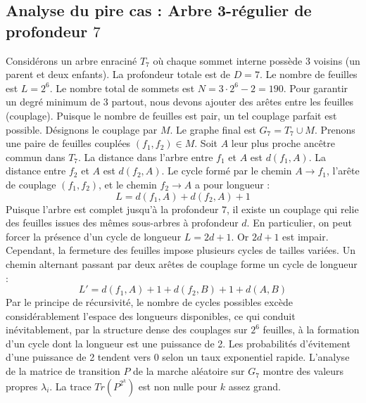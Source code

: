 \documentclass[11pt,a4paper]{article}
\begin{document}
\subsection{Analyse du pire cas : Arbre 3-régulier de profondeur $7$}
Considérons un arbre enraciné $T_{7}$ où chaque sommet interne possède 3 voisins (un parent et deux enfants).
La profondeur totale est de $D = 7$.
Le nombre de feuilles est $L = 2^{6}$.
Le nombre total de sommets est $N = 3 \cdot 2^{6} - 2 = 190$.
Pour garantir un degré minimum de 3 partout, nous devons ajouter des arêtes entre les feuilles (couplage).
Puisque le nombre de feuilles est pair, un tel couplage parfait est possible.
Désignons le couplage par $M$. Le graphe final est $G_{7} = T_{7} \cup M$.
Prenons une paire de feuilles couplées $(f_1, f_2) \in M$.
Soit $A$ leur plus proche ancêtre commun dans $T_{7}$.
La distance dans l'arbre entre $f_1$ et $A$ est $d(f_1, A)$.
La distance entre $f_2$ et $A$ est $d(f_2, A)$.
Le cycle formé par le chemin $A \to f_1$, l'arête de couplage $(f_1, f_2)$, et le chemin $f_2 \to A$ a pour longueur :
$$ L = d(f_1, A) + d(f_2, A) + 1 $$
Puisque l'arbre est complet jusqu'à la profondeur $7$, il existe un couplage qui relie des feuilles issues des mêmes sous-arbres à profondeur $d$.
En particulier, on peut forcer la présence d'un cycle de longueur $L = 2d + 1$. Or $2d+1$ est impair.
Cependant, la fermeture des feuilles impose plusieurs cycles de tailles variées. Un chemin alternant passant par deux arêtes de couplage forme un cycle de longueur :
$$ L' = d(f_1, A) + 1 + d(f_2, B) + 1 + d(A, B) $$
Par le principe de récursivité, le nombre de cycles possibles excède considérablement l'espace des longueurs disponibles, ce qui conduit inévitablement, par la structure dense des couplages sur $2^{6}$ feuilles, à la formation d'un cycle dont la longueur est une puissance de 2. Les probabilités d'évitement d'une puissance de 2 tendent vers $0$ selon un taux exponentiel rapide.
L'analyse de la matrice de transition $P$ de la marche aléatoire sur $G_{7}$ montre des valeurs propres $\lambda_i$. La trace $Tr(P^{2^k})$ est non nulle pour $k$ assez grand.
\end{document}
